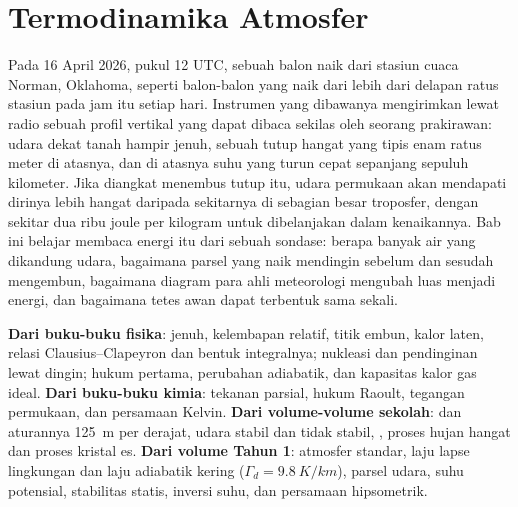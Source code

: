 \chapter{Termodinamika Atmosfer}\label{ch:b2:atmospheric-thermodynamics}

Pada 16 April 2026, pukul 12 UTC, sebuah balon naik dari stasiun cuaca Norman, Oklahoma, seperti
balon-balon yang naik dari lebih dari delapan ratus stasiun pada jam itu setiap hari. Instrumen yang
dibawanya mengirimkan lewat radio sebuah profil vertikal yang dapat dibaca sekilas oleh seorang prakirawan: udara dekat tanah
hampir jenuh, sebuah tutup hangat yang tipis enam ratus meter di atasnya, dan di atasnya suhu yang turun
cepat sepanjang sepuluh kilometer. Jika diangkat menembus tutup itu, udara permukaan akan mendapati dirinya
lebih hangat daripada sekitarnya di sebagian besar troposfer, dengan sekitar dua ribu joule per
kilogram untuk dibelanjakan dalam kenaikannya. Bab ini belajar membaca energi itu dari sebuah sondase: berapa banyak
air yang dikandung udara, bagaimana parsel yang naik mendingin sebelum dan sesudah mengembun, bagaimana diagram para
ahli meteorologi mengubah luas menjadi energi, dan bagaimana tetes awan dapat terbentuk sama sekali.

\begin{recall}
\textbf{Dari buku-buku fisika}:  jenuh, kelembapan relatif, titik embun,
kalor laten, relasi Clausius--Clapeyron dan bentuk integralnya; nukleasi dan
pendinginan lewat dingin; hukum pertama, perubahan adiabatik, dan kapasitas kalor gas ideal.
\textbf{Dari buku-buku kimia}: tekanan parsial, hukum Raoult, tegangan permukaan, dan persamaan
Kelvin. \textbf{Dari volume-volume sekolah}:  dan aturannya
\qty{125}{m} per derajat, udara stabil dan tidak stabil, , proses hujan hangat dan
proses kristal es. \textbf{Dari volume Tahun 1}: atmosfer standar, laju lapse lingkungan
dan laju adiabatik kering ($\Gamma_d = \qty{9.8}{K/km}$), parsel udara, suhu
potensial, stabilitas statis, inversi suhu, dan persamaan hipsometrik.
\end{recall}

